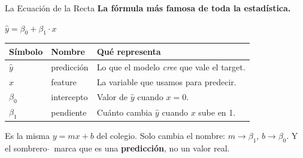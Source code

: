 \documentclass[aspectratio=169, 11pt]{beamer}
\begin{document}
\begin{frame}[shrink=5]{La Ecuación de la Recta}
  \vspace{-4pt}
  {\footnotesize\color{arcaDark}\bfseries
    La fórmula más famosa de toda la estadística.}

  \vspace{8pt}
  \begin{center}
    \begin{tcolorbox}[colback=arcaGray, colframe=arcaRed, boxrule=1pt,
                      arc=4pt, width=0.7\textwidth]
    \centering
    \large
    $\hat{y} = \beta_0 + \beta_1 \cdot x$
    \end{tcolorbox}
  \end{center}

  \vspace{6pt}
  {\scriptsize
  \begin{tabular}{@{}llp{8cm}@{}}
    \toprule
    \textbf{Símbolo} & \textbf{Nombre} & \textbf{Qué representa} \\
    \midrule
    $\hat{y}$ & predicción & Lo que el modelo \textit{cree} que vale el target. \\
    $x$ & feature & La variable que usamos para predecir. \\
    $\beta_0$ & intercepto & Valor de $\hat{y}$ cuando $x = 0$. \\
    $\beta_1$ & pendiente & Cuánto cambia $\hat{y}$ cuando $x$ sube en 1. \\
    \bottomrule
  \end{tabular}
  }

  \vspace{6pt}
  {\footnotesize\color{arcaDark}
    \faLightbulb\hspace{4pt}
    Es la misma $y = mx + b$ del colegio. Solo cambia el nombre:
    $m \to \beta_1$, $b \to \beta_0$. Y el sombrero $\hat{}\,$ marca
    que es una \textbf{predicción}, no un valor real.}
\end{frame}
\end{document}
